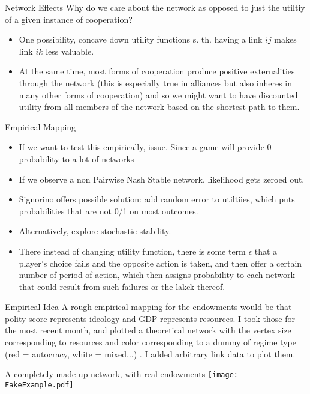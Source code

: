 \documentclass{beamer}
\begin{document}
\begin{frame}{Network Effects}
Why do we care about the network as opposed to just the utiltiy of a given instance of cooperation?
\begin{itemize}
\item One possibility, concave down utility functions s. th. having a link $ij$ makes link $ik$ less valuable. 
\item At the same time, most forms of cooperation produce positive externalities through the network (this is especially true in alliances but also inheres in many other forms of cooperation) and so we might want to have discounted utility from all members of the network based on the shortest path to them. 
\end{itemize}
\end{frame}

\begin{frame}{Empirical Mapping}
\begin{itemize}
\item If we want to test this empirically, issue. Since a game will provide 0 probability to a lot of networks
\item If we observe a non Pairwise Nash Stable network, likelihood gets zeroed out.
\item Signorino offers possible solution: add random error to utiltiies, which puts probabilities that are not 0/1 on most outcomes.
\item Alternatively, explore stochastic stability.
\item There instead of changing utility function, there is some term $\epsilon$ that a player's choice fails and the opposite action is taken, and then offer a certain number of period of action, which then assigns probability to each network that could result from such failures or the lakck thereof.
\end{itemize}
\end{frame}

\begin{frame}{Empirical Idea}
A rough empirical mapping for the endowments would be that polity score represents ideology and GDP represents resources. I took those for the most recent month, and plotted a theoretical network with the vertex size corresponding to resources and color corresponding to a dummy of regime type (red = autocracy, white = mixed...) . I added arbitrary link data to plot them. 
\end{frame}

\begin{frame}[shrink]{A completely made up network, with real endowments}
\texttt{[image: FakeExample.pdf]}
\end{frame}
\end{document}
